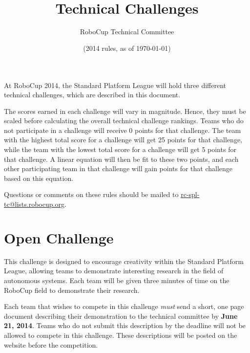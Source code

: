 \documentclass[12pt]{article}
\title{\leaguename \\ Technical Challenges}
\author{RoboCup Technical Committee}
\date{(2014 rules, as of \today)}
\begin{document}
\maketitle

At RoboCup 2014, the Standard Platform League will hold three different technical challenges, which are described in this document.

The scores earned in each challenge will vary in magnitude.  Hence, they must be scaled before calculating the overall technical challenge rankings.  Teams who do not participate in a challenge will receive 0 points for that challenge.  The team with the highest total score for a challenge will get 25 points for that challenge, while the team with the lowest total score for a challenge will get 5 points for that challenge.  A linear equation will then be fit to these two points, and each other participating team in that challenge will gain points for that challenge based on this equation.

Questions or comments on these rules should be mailed to {\small \url{rc-spl-tc@lists.robocup.org}}.

\vfill

\renewcommand\contentsname{Challenges}
\tableofcontents
\setcounter{tocdepth}{1}

\thispagestyle{fancy}

\clearpage

\cfoot{\thepage}
\setcounter{page}{1}






\section{Open Challenge}
\newcommand{\openMinNum}{three}

This challenge is designed to encourage creativity within the Standard 
Platform League, allowing teams to demonstrate interesting research in 
the field of autonomous systems. Each team will be given \openMinNum{} 
minutes of time on the RoboCup field to demonstrate their research.

Each team that wishes to compete in this challenge \emph{must} send a 
short, one page document describing their demonstration to the technical 
committee by \textbf{June 21, 2014}.  Teams who do not submit this description by 
the deadline will not be allowed to compete in this challenge. These 
descriptions will be posted on the website before the competition.
\end{document}
